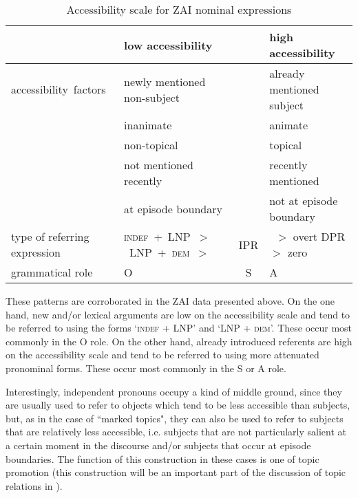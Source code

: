 \begin{table}
\small
\begin{tabularx}{\textwidth}{Ql@{}c@{}l}
\lsptoprule
   
&   \textbf{low accessibility}  &  &  \textbf{high accessibility}  \\
  
 
\midrule 

\mbox{accessibility factors} &  newly mentioned non-subject  &   & already mentioned  subject  \\
 
		      &    inanimate  &  & animate  \\
		      &     non-topical  &   & topical  \\
		      &      not mentioned recently  &  & recently mentioned   \\
		      &      at episode boundary  &   & not at episode boundary \\
       
  
\midrule
 
type of referring expression & \mbox{\textsc{indef}  + LNP $>$ LNP + \textsc{dem}  $>$} &    IPR   &~$>$  overt DPR $>$ zero \\
 

 
\midrule 
  grammatical role & \hfill O \hfill &  S &\hfill A \hfill\\ 
\midrule

\end{tabularx}
\caption{{Accessibility scale for ZAI nominal expressions}}
\label{accessibilityscale}

\end{table}
 
These patterns are corroborated in the ZAI data presented above. On the one hand, new and/or lexical arguments are low on the accessibility scale and tend to be referred to using the forms `\textsc{indef}  + LNP' and `LNP + \textsc{dem}'. These occur most commonly in the O role. On the other hand, already introduced referents are high on the accessibility scale and tend to be referred to using more attenuated pronominal forms. These occur most commonly in the S or A role. 

Interestingly, independent pronouns occupy a kind of middle ground, since they are usually used to refer to objects which tend to be less accessible than subjects, but, as in the case of ``marked topics", they can also be used to refer to subjects that are relatively less accessible, i.e. subjects that are not particularly salient at a certain moment in the discourse and/or subjects that occur at episode boundaries. The function of this construction in these cases is one of topic promotion (this construction will be an important part of the discussion of topic relations in ).

